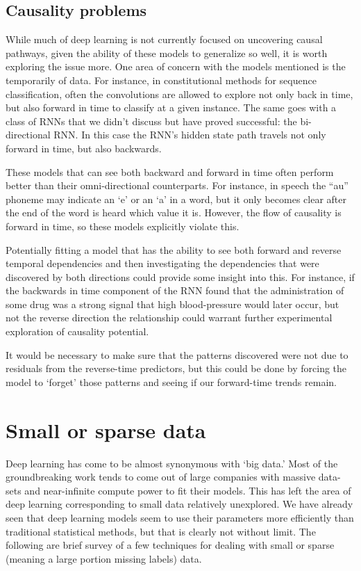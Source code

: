 \documentclass[]{book}
\theoremstyle{definition}
\theoremstyle{definition}
\theoremstyle{definition}
\theoremstyle{remark}
\begin{document}
\subsection{Causality problems}\label{causality-problems}

While much of deep learning is not currently focused on uncovering
causal pathways, given the ability of these models to generalize so
well, it is worth exploring the issue more. One area of concern with the
models mentioned is the temporarily of data. For instance, in
constitutional methods for sequence classification, often the
convolutions are allowed to explore not only back in time, but also
forward in time to classify at a given instance. The same goes with a
class of RNNs that we didn't discuss but have proved successful: the
bi-directional RNN. In this case the RNN's hidden state path travels not
only forward in time, but also backwards.

These models that can see both backward and forward in time often
perform better than their omni-directional counterparts. For instance,
in speech the ``au'' phoneme may indicate an `e' or an `a' in a word,
but it only becomes clear after the end of the word is heard which value
it is. However, the flow of causality is forward in time, so these
models explicitly violate this.

Potentially fitting a model that has the ability to see both forward and
reverse temporal dependencies and then investigating the dependencies
that were discovered by both directions could provide some insight into
this. For instance, if the backwards in time component of the RNN found
that the administration of some drug was a strong signal that high
blood-pressure would later occur, but not the reverse direction the
relationship could warrant further experimental exploration of causality
potential.

It would be necessary to make sure that the patterns discovered were not
due to residuals from the reverse-time predictors, but this could be
done by forcing the model to `forget' those patterns and seeing if our
forward-time trends remain.

\section{Small or sparse data}\label{small-or-sparse-data}

Deep learning has come to be almost synonymous with `big data.' Most of
the groundbreaking work tends to come out of large companies with
massive data-sets and near-infinite compute power to fit their models.
This has left the area of deep learning corresponding to small data
relatively unexplored. We have already seen that deep learning models
seem to use their parameters more efficiently than traditional
statistical methods, but that is clearly not without limit. The
following are brief survey of a few techniques for dealing with small or
sparse (meaning a large portion missing labels) data.
\end{document}
